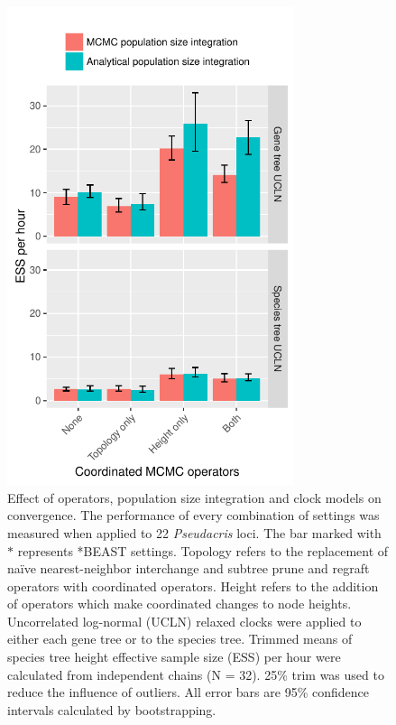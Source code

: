 \documentclass[12pt]{article}
\begin{document}
\begin{figure}[htb!]
\centering
\includegraphics[height=14cm]{speciesTreeHeight_ess_per_hour.pdf}
\caption
{Effect of operators, population size integration and clock models on
convergence. The performance of every combination of settings was measured when
applied to 22 \textit{Pseudacris} loci. The bar marked with $\ast$ represents *BEAST
settings. Topology refers to the
replacement of na\"ive nearest-neighbor interchange and subtree prune and regraft operators with coordinated operators. Height
refers to the addition of operators which make coordinated changes to
node heights. Uncorrelated log-normal (UCLN) relaxed clocks were applied
to either each gene tree or to the species tree. Trimmed means of species tree
height effective sample size (ESS) per hour were calculated from independent
chains (N = 32). 25\% trim was used to reduce the influence of outliers. All error bars
are 95\% confidence intervals calculated by bootstrapping.}
\label{fig:realEssPerHour}
\end{figure}
\end{document}

